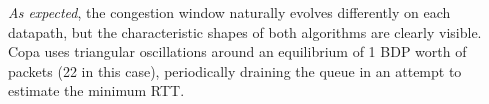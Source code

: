 \textit{As expected}, the congestion window naturally evolves differently on each datapath, but the characteristic shapes of both algorithms are clearly visible. Copa uses triangular oscillations around an equilibrium of 1 BDP worth of packets (22 in this case), periodically draining the queue in an attempt to estimate the minimum RTT.



%
%
%
%
%
